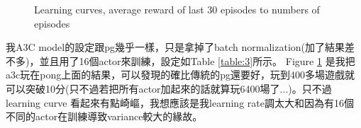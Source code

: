 \documentclass[12pt, a4paper]{article}
\begin{document}
\begin{CJK}{UTF8}{bkai}
\begin{figure}[!htb]
\centering
{}
\hfill
{}
\hfill
\caption{Learning curves, average reward of last 30 episodes to numbers of episodes}
\label{fig:f12}
\end{figure}
\noindent
我A3C model的設定跟pg幾乎一樣，只是拿掉了batch normalization(加了結果差不多)，並且用了16個actor來訓練，設定如Table \ref{table:3}所示。
Figure \ref{fig:f12} 是我把a3c玩在pong上面的結果，可以發現的確比傳統的pg還要好，玩到400多場遊戲就可以突破10分(只不過若把所有actor加起來的話就算玩6400場了...)。只不過learning curve 看起來有點崎嶇，我想應該是我learning rate調太大和因為有16個不同的actor在訓練導致variance較大的緣故。


\end{CJK}
\end{document}
